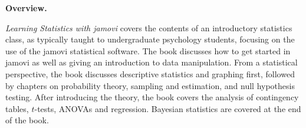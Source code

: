 

\clearpage
\newpage
\begin{center}
{\bf Overview.}
\end{center}

{\it Learning Statistics with jamovi} covers the contents of an introductory statistics class, as typically taught to undergraduate psychology students, focusing on the use of the jamovi statistical software. The book discusses how to get started in jamovi as well as giving an introduction to data manipulation. From a statistical perspective, the book discusses descriptive statistics and graphing first, followed by chapters on probability theory, sampling and estimation, and null hypothesis testing. After introducing the theory, the book covers the analysis of contingency tables, $t$-tests, ANOVAs and regression. Bayesian statistics are covered at the end of the book. 

